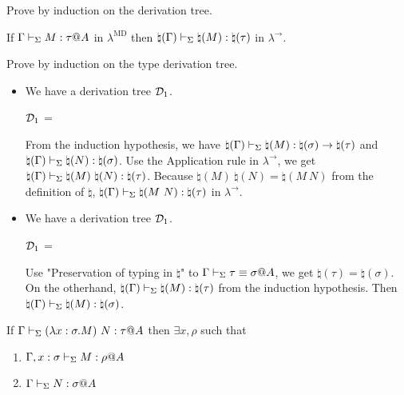 Prove by induction on the derivation tree.

\begin{lemma}
	If $\G \V M:\tau@A$ in $\lambda^{\text{MD}}$ then $\natural(\Gamma) \vdash_\Sigma \natural(M): \natural(\tau)$ in $\lambda^\to$.
\end{lemma}

Prove by induction on the type derivation tree.

\begin{itemize}
	\item \TApp

	      We have a derivation tree $\mathcal{D}_1$.

	      $\mathcal{D}_1$ = 
	      { \andalso {}}

	      From the induction hypothesis, we have $\natural(\Gamma) \vdash_\Sigma \natural(M) : \natural(\sigma) \to \natural(\tau)$ and $\natural(\Gamma) \vdash_\Sigma \natural(N) : \natural(\sigma)$.
	      Use the Application rule in $\lambda^\to$, we get $\natural(\G) \V \natural(M)\ \natural(N) : \natural(\tau)$.
	      Because $\natural(M)\ \natural(N) = \natural(M\ N)$ from the definition of $\natural$, $\natural(\Gamma) \vdash_\Sigma \natural(M\ N) : \natural(\tau)$ in $\lambda^\to$.
	\item \TConv

	      We have a derivation tree $\mathcal{D}_1$.

	      $\mathcal{D}_1$ = 
	      { \andalso \ID{\G\V \tau\E\sigma@A}}

	      Use "Preservation of typing in $\natural$" to $\G\V \tau\E\sigma@A$, we get $\natural(\tau) = \natural(\sigma)$.
	      On the otherhand, $\natural(\Gamma) \vdash_\Sigma \natural(M):\natural(\tau)$ from the induction hypothesis.
	      Then $\natural(\Gamma) \vdash_\Sigma \natural(M):\natural(\sigma)$.

\end{itemize}

\begin{lemma}
	\begin{item}
	      \item If $\G \V (\lambda x:\sigma.M)\ N: \tau@A$ then $\exists x, \rho$ such that
	      \begin{enumerate}
		      \item $\Gamma, x:\sigma \vdash_\Sigma M : \rho @A$
		      \item $\Gamma \vdash_\Sigma N:\sigma @ A$
	      \end{enumerate}
	\end{item}
\end{lemma}

